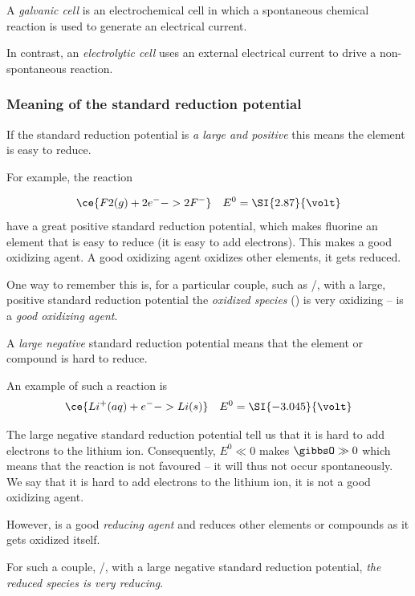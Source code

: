 \documentclass[../mit-general-chemistry.tex]{subfiles}
\begin{document}
A {\em galvanic cell} is an electrochemical cell in which a
spontaneous chemical reaction is used to generate an electrical
current.

In contrast, an {\em electrolytic cell} uses an external electrical
current to drive a non-spontaneous reaction.




\subsubsection{Meaning of the standard reduction potential}


If the standard reduction potential is {\em a large and positive} this
means the element is easy to reduce.


For example, the reaction

\begin{align}
  &\ce{F2(g) + 2e^- -> 2F^-}&E^0 = \SI{2.87}{\volt}
\end{align}
have a great positive standard reduction potential, which makes
fluorine an element that is easy to reduce (it is easy to add
electrons). This makes  a good oxidizing agent. A good
oxidizing agent oxidizes other elements, it gets reduced.

One way to remember this is, for a particular couple, such as
/, with a large, positive standard reduction potential
the {\em oxidized species} () is very oxidizing -- is a {\em
  good oxidizing agent}.



A {\em large negative} standard reduction potential means that the
element or compound is hard to reduce.

An example of such a reaction is
\begin{align}
  &\ce{Li^+(aq) + e^- -> Li(s)}&E^0 = \SI{-3.045}{\volt}
\end{align}

The large negative standard reduction potential tell us that it is
hard to add electrons to the lithium ion. Consequently, $E^0\ll 0$
makes $\gibbsO\gg 0$ which means that the reaction is not favoured --
it will thus not occur spontaneously. We say that it is hard to add
electrons to the lithium ion, it is not a good oxidizing agent.

However,  is a good {\em reducing agent} and reduces other
elements or compounds as it gets oxidized itself.

For such a couple, /, with a large negative standard
reduction potential, {\em the reduced species is very reducing}.
\end{document}
